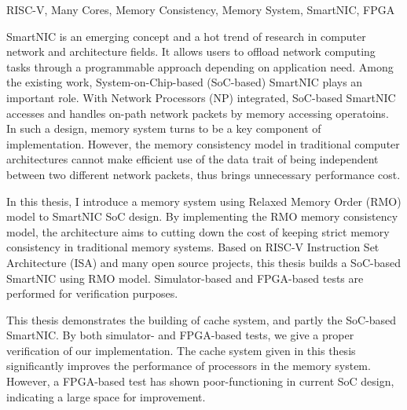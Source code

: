 \documentclass[supercite,notofont,hustthesis]{HustGraduPaper}
\begin{document}
\begin{enabstract}{RISC-V, Many Cores, Memory Consistency, Memory System, SmartNIC, FPGA}

SmartNIC is an emerging concept and a hot trend of research in computer network
and architecture fields. It allows users to offload network computing tasks
through a programmable approach depending on application need. Among the
existing work, System-on-Chip-based (SoC-based) SmartNIC plays an important
role. With Network Processors (NP) integrated, SoC-based SmartNIC accesses and
handles on-path network packets by memory accessing operatoins. In such a
design, memory system turns to be a key component of implementation. However,
the memory consistency model in traditional computer architectures cannot make
efficient use of the data trait of being independent between two different
network packets, thus brings unnecessary performance cost.

In this thesis, I introduce a memory system using Relaxed Memory Order (RMO)
model to SmartNIC SoC design. By implementing the RMO memory consistency model,
the architecture aims to cutting down the cost of keeping strict memory
consistency in traditional memory systems. Based on RISC-V Instruction Set
Architecture (ISA) and many open source projects, this thesis builds a SoC-based
SmartNIC using RMO model. Simulator-based and FPGA-based tests are performed for
verification purposes.

This thesis demonstrates the building of cache system, and partly the SoC-based
SmartNIC. By both simulator- and FPGA-based tests, we give a proper verification
of our implementation. The cache system given in this thesis significantly
improves the performance of processors in the memory system. However, a
FPGA-based test has shown poor-functioning in current SoC design, indicating a
large space for improvement.

\end{enabstract}

\tableofcontents[level=2]

\clearpage








\end{document}

